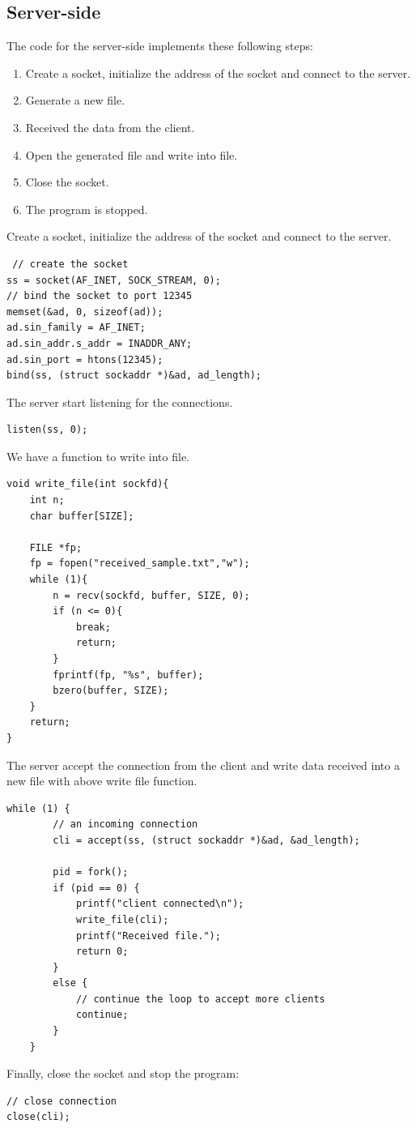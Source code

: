 \documentclass[times, 10pt]{thesisMDH}
\begin{document}
\subsection{Server-side}
The code for the server-side implements these following steps:
\begin{enumerate}
    \item Create a socket, initialize the address of the socket and connect to the server.
    \item Generate a new file.
    \item Received the data from the client. 
    \item Open the generated file and write into file.
    \item Close the socket.
    \item The program is stopped.
\end{enumerate}
Create a socket, initialize the address of the socket and connect to the server.
\begin{lstlisting}
 // create the socket
ss = socket(AF_INET, SOCK_STREAM, 0);
// bind the socket to port 12345
memset(&ad, 0, sizeof(ad));
ad.sin_family = AF_INET;
ad.sin_addr.s_addr = INADDR_ANY;
ad.sin_port = htons(12345);
bind(ss, (struct sockaddr *)&ad, ad_length);
\end{lstlisting}
The server start listening for the connections.
\begin{lstlisting}
listen(ss, 0);
\end{lstlisting}
We have a function to write into file.
\begin{lstlisting}
void write_file(int sockfd){
	int n;
	char buffer[SIZE];
	
	FILE *fp;
	fp = fopen("received_sample.txt","w");
	while (1){
		n = recv(sockfd, buffer, SIZE, 0);
		if (n <= 0){
			break;
			return;
		}
		fprintf(fp, "%s", buffer);
		bzero(buffer, SIZE);
	}
	return;
}
\end{lstlisting}
The server accept the connection from the client and write data received into a new file with above write file function. 
\begin{lstlisting}
while (1) {
        // an incoming connection
        cli = accept(ss, (struct sockaddr *)&ad, &ad_length);

        pid = fork();
        if (pid == 0) {
            printf("client connected\n");
            write_file(cli);
            printf("Received file.");
            return 0;
        }
        else {
            // continue the loop to accept more clients
            continue;
        }
    }
\end{lstlisting}
Finally, close the socket and stop the program:
\begin{lstlisting}
// close connection
close(cli);
\end{lstlisting}
\end{document}
